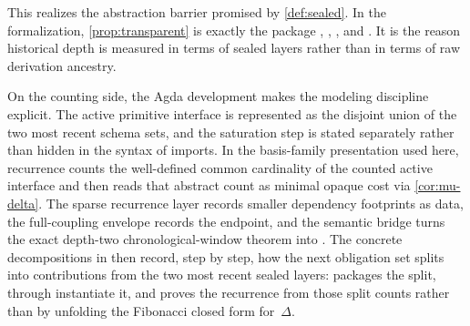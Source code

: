 \documentclass{lmcs}
\begin{document}
This realizes the abstraction barrier promised by \autoref{def:sealed}. In the formalization, \autoref{prop:transparent} is exactly the package , , , and . It is the reason historical depth is measured in terms of sealed layers rather than in terms of raw derivation ancestry.

On the counting side, the Agda development makes the modeling discipline explicit. The active primitive interface is represented as the disjoint union of the two most recent schema sets, and the saturation step is stated separately rather than hidden in the syntax of imports. In the basis-family presentation used here, recurrence counts the well-defined common cardinality of the counted active interface and then reads that abstract count as minimal opaque cost via \autoref{cor:mu-delta}. The sparse recurrence layer records smaller dependency footprints as  data, the full-coupling envelope records the  endpoint, and the semantic bridge turns the exact depth-two chronological-window theorem into . The concrete decompositions in  then record, step by step, how the next obligation set splits into contributions from the two most recent sealed layers:  packages the split,  through  instantiate it, and  proves the recurrence from those split counts rather than by unfolding the Fibonacci closed form for~$\Delta$.
\end{document}

